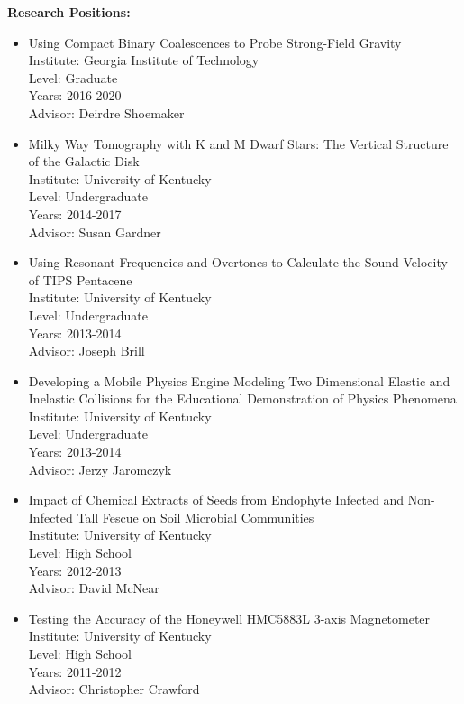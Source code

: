 \documentclass[11pt]{article}
\begin{document}
\begin{flushleft}
  \textbf{Research Positions:}
  \begin{itemize}
  \item Using Compact Binary Coalescences to Probe Strong-Field Gravity \\
    Institute: Georgia Institute of Technology \\
    Level: Graduate \\
    Years: 2016-2020 \\
    Advisor: Deirdre Shoemaker 
  \item Milky Way Tomography with K and M Dwarf Stars: The Vertical Structure of the Galactic Disk \\
    Institute: University of Kentucky \\
    Level: Undergraduate \\
    Years: 2014-2017 \\
    Advisor: Susan Gardner
  \item Using Resonant Frequencies and Overtones to Calculate the Sound Velocity of TIPS Pentacene \\
    Institute: University of Kentucky \\
    Level: Undergraduate \\
    Years: 2013-2014 \\
    Advisor: Joseph Brill
  \item Developing a Mobile Physics Engine Modeling Two Dimensional Elastic and Inelastic Collisions for the Educational Demonstration of Physics Phenomena \\
    Institute: University of Kentucky \\
    Level: Undergraduate \\
    Years: 2013-2014 \\
    Advisor: Jerzy Jaromczyk 
  \item Impact of Chemical Extracts of Seeds from Endophyte Infected and Non-Infected Tall Fescue on Soil Microbial Communities \\
    Institute: University of Kentucky \\
    Level: High School \\
    Years: 2012-2013 \\
    Advisor: David McNear
  \item Testing the Accuracy of the Honeywell HMC5883L 3-axis Magnetometer \\
    Institute: University of Kentucky \\
    Level: High School \\
    Years: 2011-2012 \\
    Advisor: Christopher Crawford
  \end{itemize}


\end{flushleft}
\end{document}
